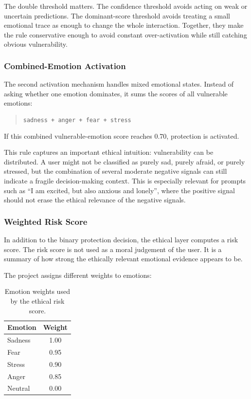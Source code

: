 \documentclass[11pt,a4paper]{article}
\newcommand{\code}[1]{\texttt{#1}}
\begin{document}
The double threshold matters. The confidence threshold avoids acting on weak or uncertain
predictions. The dominant-score threshold avoids treating a small emotional trace as enough
to change the whole interaction. Together, they make the rule conservative enough to avoid
constant over-activation while still catching obvious vulnerability.

\subsubsection{Combined-Emotion Activation}

The second activation mechanism handles mixed emotional states. Instead of asking whether
one emotion dominates, it sums the scores of all vulnerable emotions:

\begin{quote}
\code{sadness + anger + fear + stress}
\end{quote}

If this combined vulnerable-emotion score reaches 0.70, protection is activated.

This rule captures an important ethical intuition: vulnerability can be distributed. A user
might not be classified as purely sad, purely afraid, or purely stressed, but the combination
of several moderate negative signals can still indicate a fragile decision-making context.
This is especially relevant for prompts such as ``I am excited, but also anxious and
lonely'', where the positive signal should not erase the ethical relevance of the negative
signals.

\subsubsection{Weighted Risk Score}

In addition to the binary protection decision, the ethical layer computes a risk score. The
risk score is not used as a moral judgement of the user. It is a summary of how strong the
ethically relevant emotional evidence appears to be.

The project assigns different weights to emotions:

\begin{table}[h]
\centering
\begin{tabular}{lc}
\toprule
\textbf{Emotion} & \textbf{Weight} \\
\midrule
Sadness & 1.00 \\
Fear & 0.95 \\
Stress & 0.90 \\
Anger & 0.85 \\
Neutral & 0.00 \\
\bottomrule
\end{tabular}
\caption{Emotion weights used by the ethical risk score.}
\label{tab:weights}
\end{table}
\end{document}
